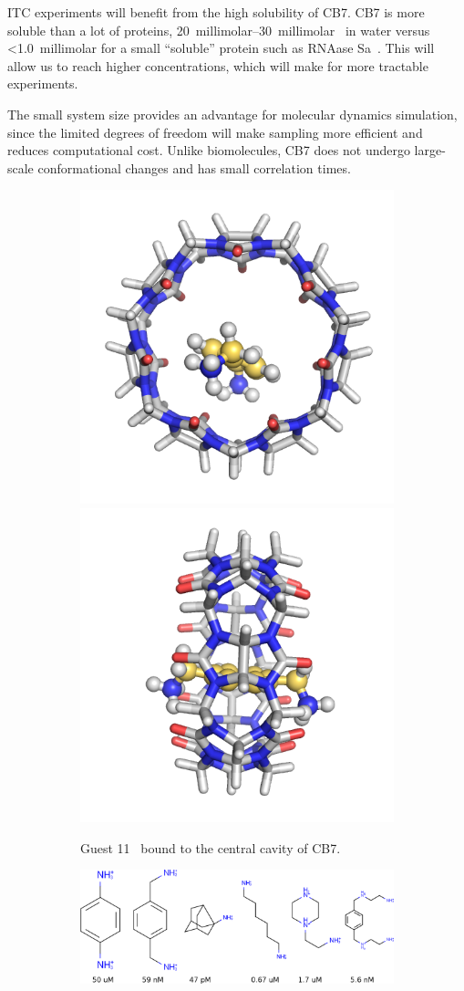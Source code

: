 \documentclass[10pt,final]{article}
\begin{document}
%
ITC experiments will benefit from the high solubility of CB7.
%
CB7 is more soluble than a lot of proteins, \SIrange[scientific-notation=false]{20}{30}{millimolar}~\cite{Lagona2005a} in water versus \textless \SI{1.0}{millimolar} for a small ``soluble'' protein such as RNAase Sa~\cite{Pace2004a}.
%
This will allow us to reach higher concentrations, which will make for more tractable experiments.

The small system size provides an advantage for molecular dynamics simulation, since the limited degrees of freedom will make sampling more efficient and reduces computational cost.
%
Unlike biomolecules, CB7 does not undergo large-scale conformational changes and has small correlation times.

\begin{figure}[H]
\centering
\begin{subfigure}{.5\textwidth}
  \centering
  \includegraphics[width=.4\linewidth]{figures/guest11_top.png}
  \includegraphics[width=.4\linewidth]{figures/guest11_side.png}
  \caption{Guest 11~\cite{Cao2013a} bound to the central cavity of CB7.}
  \label{fig:sub1}
\end{subfigure}%
\begin{subfigure}{.5\textwidth}
  \centering
  \includegraphics[width=0.95\linewidth]{figures/Kd_guest.png}  

\end{subfigure}
\end{figure}
\end{document}
